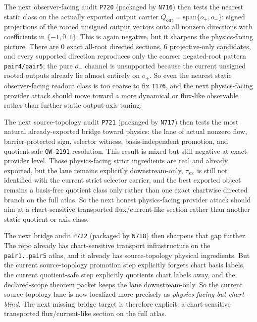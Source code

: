 \documentclass[11pt,a4paper]{article}
\begin{document}
The next observer-facing audit \texttt{P720} (packaged by \texttt{N716}) then tests the nearest static class on the actually exported
output carrier \(Q_{\mathrm{out}}=\mathrm{span}\{o_+,o_-\}\): signed projections of the rooted unsigned output vectors onto all
nonzero directions with coefficients in \(\{-1,0,1\}\). This is again negative, but it sharpens the physics-facing picture.
There are \(0\) exact all-root directed sections, \(6\) projective-only candidates, and every supported direction reproduces only the
coarser negated-root pattern \texttt{pair4/pair5}; the pure \(o_-\) channel is unsupported because the current unsigned rooted outputs
already lie almost entirely on \(o_+\). So even the nearest static observer-facing readout class is too coarse to fix \texttt{T176},
and the next physics-facing provider attack should move toward a more dynamical or flux-like observable rather than further static
output-axis tuning.

The next source-topology audit \texttt{P721} (packaged by \texttt{N717}) then tests the most natural already-exported bridge toward
physics: the lane of actual nonzero flow, barrier-protected sign, selector witness, basis-independent promotion, and quotient-safe
\texttt{QW-2191} resolution. This result is mixed but still negative at exact-provider level. Those physics-facing strict ingredients are
real and already exported, but the lane remains explicitly downstream-only, \(\tau_{\mathrm{src}}\) is still not identified with the
current strict selector carrier, and the best exported object remains a basis-free quotient class only rather than one exact chartwise
directed branch on the full atlas. So the next honest physics-facing provider attack should aim at a chart-sensitive transported
flux/current-like section rather than another static quotient or axis class.

The next bridge audit \texttt{P722} (packaged by \texttt{N718}) then sharpens that gap further. The repo already has chart-sensitive
transport infrastructure on the \texttt{pair1..pair5} atlas, and it already has source-topology physical ingredients. But the current
source-topology promotion step explicitly forgets chart basis labels, the current quotient-safe step explicitly quotients chart labels
away, and the declared-scope theorem packet keeps the lane downstream-only. So the current source-topology lane is now localized more
precisely as \emph{physics-facing but chart-blind}. The next missing bridge target is therefore explicit: a chart-sensitive transported
flux/current-like section on the full atlas.
\end{document}

